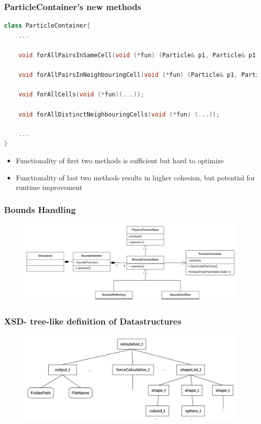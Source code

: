 \begin{frame}[fragile]
	\frametitle{ParticleContainer's new methods}
	\vspace{0.4cm}
	
	\begin{lstlisting}[language=C++]
class ParticleContainer{
	...

	void forAllPairsInSameCell(void (*fun) (Particle& p1, Particle& p1));
	
	void forAllPairsInNeighbouringCell(void (*fun) (Particle& p1, Particle& p1));
	
	void forAllCells(void (*fun)(...));
	
	void forAllDistinctNeighbouringCells(void (*fun) (...));
		
	...
}
\end{lstlisting}

	\large

\begin{itemize}
	\item Functionality of first two methods is sufficient but hard to optimize
	\item Functionality of last two methods results in higher cohesion, but potential for runtime improvement
\end{itemize}
	
\end{frame}

\begin{frame}
	\frametitle{Bounds Handling}
	\large
	\begin{figure}
		\centering
		\includegraphics[width=0.9\linewidth]{BoundaryMolSim}
		\label{fig:boundarymolsim}
	\end{figure}
\end{frame}

\begin{frame}
	\frametitle{XSD- tree-like definition of Datastructures}
	\begin{figure}
		\centering
		\includegraphics[width=\linewidth]{xsdScetch}
		\label{fig:xsdscetchtbc}
	\end{figure}
	
	
\end{frame}

